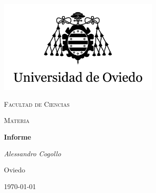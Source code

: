 \documentclass[titlepage,a4paper]{article}
\newcommand{\titulo}{Informe}
\newcommand{\facultad}{Ciencias} %
\newcommand{\autor}{Alessandro Cogollo}
\newcommand{\materia}{Materia}
\newcommand{\ciudad}{Oviedo}
\newcommand{\fecha}{\today} %
\theoremstyle{definition}
\theoremstyle{remark}
\begin{document}
	
	
	\begin{titlepage}
		
		\centering	
		
		\includegraphics[width=0.6\textwidth]{escudo.jpg}\par\vspace{0.5cm}
		
		{\scshape\LARGE Facultad de \facultad\par}
		
		\vspace{1cm}
		
		{\scshape\Large \materia\par}
		
		\vspace{1.5cm}
		
		{\huge\bfseries \titulo\par}	%
		
		\vspace{3cm}
		
		{\Large\itshape \autor} %
		
		\vfill
		
		\ciudad\par
		
		\fecha
		
	\end{titlepage}
	
	
	\clearpage\thispagestyle{empty}\mbox{}\setcounter{page}{0}\clearpage
    
\end{document}
